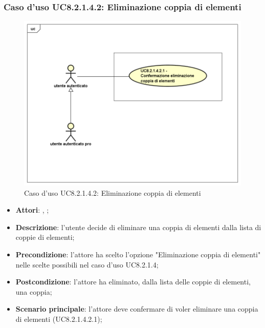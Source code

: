 	\subsubsection{Caso d'uso UC8.2.1.4.2: Eliminazione coppia di elementi}
	\label{UC8.2.1.4.2}
	\begin{figure}[h]
		\centering
		\includegraphics[scale=0.5,keepaspectratio]{UML/UC8_2_1_4_2.png}
		\caption{Caso d'uso UC8.2.1.4.2: Eliminazione coppia di elementi}
	\end{figure}
	\FloatBarrier
	\begin{itemize}
		\item \textbf{Attori}: \uau, \uaupro;
		\item \textbf{Descrizione}: l'utente decide di eliminare una coppia di elementi dalla lista di coppie di elementi;
		\item \textbf{Precondizione}: l'attore ha scelto l'opzione "Eliminazione coppia di elementi" nelle scelte possibili nel caso d'uso UC8.2.1.4;
		\item \textbf{Postcondizione}: l'attore ha eliminato, dalla lista delle coppie di elementi, una coppia;
		\item \textbf{Scenario principale}: l'attore deve confermare di voler eliminare una coppia di elementi (UC8.2.1.4.2.1); 
	\end{itemize}
	
